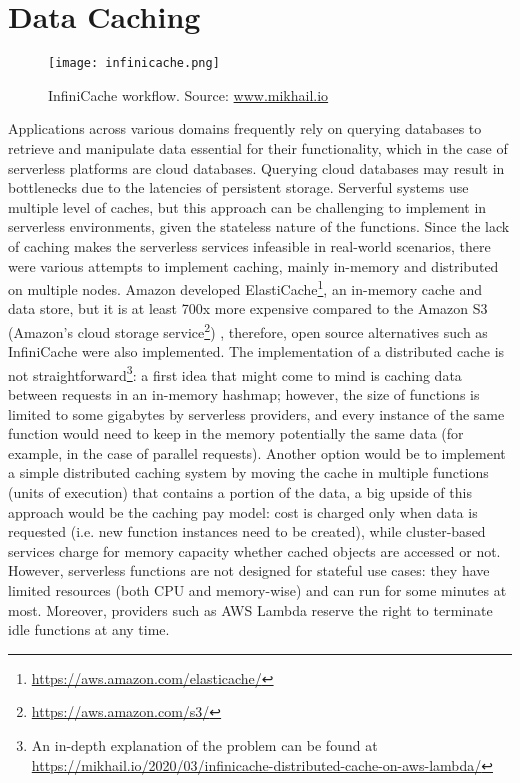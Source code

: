 \documentclass[
	a4paper, %
	12pt,
	twoside, %
]{LTJournalArticle}
\begin{document}
\section{Data Caching}
\label{sec:caching}
\begin{figure*}[!hbt]
	\texttt{[image: infinicache.png]}
	\caption{InfiniCache workflow. Source: \href{https://mikhail.io/2020/03/infinicache-distributed-cache-on-aws-lambda/}{www.mikhail.io}}
	\label{fig:infinicache}
\end{figure*}
Applications across various domains frequently rely on querying databases to retrieve and manipulate data essential for their functionality, which in the case of serverless platforms are cloud databases. Querying cloud databases may result in bottlenecks due to the latencies of persistent storage. Serverful systems use multiple level of caches, but this approach can be challenging to implement in serverless environments, given the stateless nature of the functions.
Since the lack of caching makes the serverless services infeasible in real-world scenarios, there were various attempts to implement caching, mainly in-memory and distributed on multiple nodes. Amazon developed ElastiCache\footnote{\url{https://aws.amazon.com/elasticache/}}, an in-memory cache and data store, but it is at least 700x more expensive compared to the Amazon S3 (Amazon's cloud storage service\footnote{\url{https://aws.amazon.com/s3/}}) \cite{shafiei_serverless_2022}, therefore, open source alternatives such as InfiniCache \cite{wang_infinicache_nodate} were also implemented. 
The implementation of a distributed cache is not straightforward\footnote{An in-depth explanation of the problem can be found at \url{https://mikhail.io/2020/03/infinicache-distributed-cache-on-aws-lambda/}}: a first idea that might come to mind is caching data between requests in an in-memory hashmap; however, the size of functions is limited to some gigabytes by serverless providers, and every instance of the same function would need to keep in the memory potentially the same data (for example, in the case of parallel requests).
Another option would be to implement a simple distributed caching system by moving the cache in multiple functions (units of execution) that contains a portion of the data, a big upside of this approach would be the caching pay model: cost is charged only when data is requested (i.e. new function instances need to be created), while cluster-based services charge for memory capacity whether cached objects are accessed or not.
However, serverless functions are not designed for stateful use cases: they have limited resources (both CPU and memory-wise) and can run for some minutes at most. Moreover, providers such as AWS Lambda reserve the right to terminate idle functions at any time.
\end{document}
